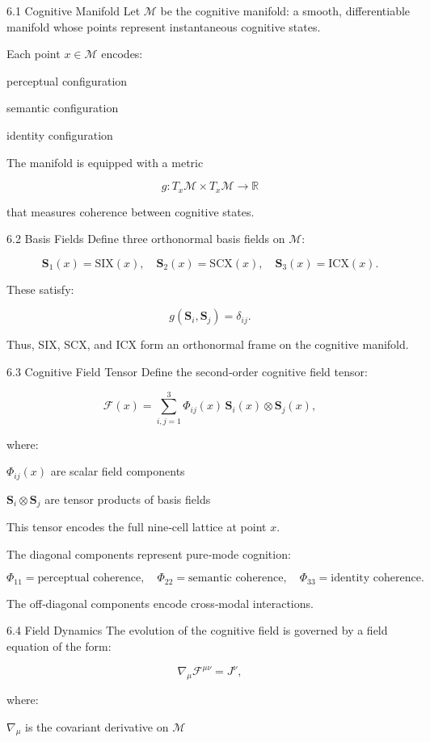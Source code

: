 6.1 Cognitive Manifold Let \(\mathcal{M}\) be the cognitive manifold: a smooth, differentiable manifold whose points represent instantaneous cognitive states.

Each point \(x \in \mathcal{M}\) encodes:

perceptual configuration

semantic configuration

identity configuration

The manifold is equipped with a metric

\[
g : T_x\mathcal{M} \times T_x\mathcal{M} \rightarrow \mathbb{R}
\]

that measures coherence between cognitive states.

6.2 Basis Fields Define three orthonormal basis fields on \(\mathcal{M}\):

\[
\mathbf{S}_1(x) = \mathrm{SIX}(x),\quad
\mathbf{S}_2(x) = \mathrm{SCX}(x),\quad
\mathbf{S}_3(x) = \mathrm{ICX}(x).
\]

These satisfy:

\[
g(\mathbf{S}_i,\mathbf{S}_j)=\delta_{ij}.
\]

Thus, SIX, SCX, and ICX form an orthonormal frame on the cognitive manifold.

6.3 Cognitive Field Tensor Define the second‑order cognitive field tensor:

\[
\mathcal{F}(x) = \sum_{i,j=1}^{3} \Phi_{ij}(x)\, \mathbf{S}_i(x) \otimes \mathbf{S}_j(x),
\]

where:

\(\Phi_{ij}(x)\) are scalar field components

\(\mathbf{S}_i \otimes \mathbf{S}_j\) are tensor products of basis fields

This tensor encodes the full nine‑cell lattice at point \(x\).

The diagonal components represent pure‑mode cognition:

\[
\Phi_{11} = \text{perceptual coherence},\quad
\Phi_{22} = \text{semantic coherence},\quad
\Phi_{33} = \text{identity coherence}.
\]

The off‑diagonal components encode cross‑modal interactions.

6.4 Field Dynamics The evolution of the cognitive field is governed by a field equation of the form:

\[
\nabla_{\mu} \mathcal{F}^{\mu\nu} = J^{\nu},
\]

where:

\(\nabla_{\mu}\) is the covariant derivative on \(\mathcal{M}\)

